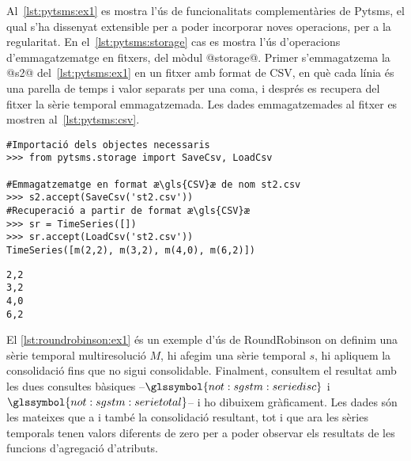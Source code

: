 Al~\autoref{lst:pytsms:ex1} es mostra l'ús de funcionalitats
complementàries de Pytsms, el qual s'ha dissenyat extensible per a
poder incorporar noves operacions, per a la regularitat.  En
el~\autoref{lst:pytsms:storage} cas es mostra l'ús d'operacions
d'emmagatzematge en fitxers, del mòdul @storage@. Primer s'emmagatzema
la @s2@ del~\autoref{lst:pytsms:ex1} en un fitxer amb format de
\gls{CSV}, en què cada línia és una parella de temps i valor separats
per una coma, i després es recupera del fitxer la sèrie temporal
emmagatzemada. Les dades emmagatzemades al fitxer es mostren
al~\autoref{lst:pytsms:csv}.
\begin{lstlisting}[style=py,caption=Operacions complementàries de Pytsms per a l'emmagatzematge,label=lst:pytsms:storage]
#Importació dels objectes necessaris
>>> from pytsms.storage import SaveCsv, LoadCsv

#Emmagatzematge en format æ\gls{CSV}æ de nom st2.csv
>>> s2.accept(SaveCsv('st2.csv'))
#Recuperació a partir de format æ\gls{CSV}æ
>>> sr = TimeSeries([])
>>> sr.accept(LoadCsv('st2.csv'))
TimeSeries([m(2,2), m(3,2), m(4,0), m(6,2)])
\end{lstlisting}

\begin{lstlisting}[style=file,caption=Dades del fitxer st2.csv,label=lst:pytsms:csv]
2,2
3,2
4,0
6,2
\end{lstlisting}






El \autoref{lst:roundrobinson:ex1} és un exemple d'ús de RoundRobinson
on definim una sèrie temporal multiresolució $M$, hi afegim una sèrie
temporal $s$, hi apliquem la consolidació fins que no sigui
consolidable. Finalment, consultem el resultat amb les dues consultes
bàsiques --$\glssymbol{not:sgstm:seriedisc}$ i
$\glssymbol{not:sgstm:serietotal}$-- i ho dibuixem gràficament.  Les
dades són les mateixes que a  i també la
consolidació resultant, tot i que ara les sèries temporals tenen
valors diferents de zero per a poder observar els resultats de les
funcions d'agregació d'atributs.



